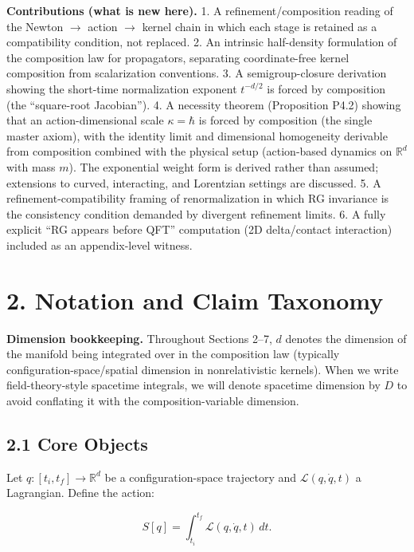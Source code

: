 \documentclass[
]{article}
\begin{document}
\textbf{Contributions (what is new here).} 1. A refinement/composition
reading of the Newton \(\to\) action \(\to\) kernel chain in which each
stage is retained as a compatibility condition, not replaced. 2. An
intrinsic half-density formulation of the composition law for
propagators, separating coordinate-free kernel composition from
scalarization conventions. 3. A semigroup-closure derivation showing the
short-time normalization exponent \(t^{-d/2}\) is forced by composition
(the ``square-root Jacobian''). 4. A necessity theorem (Proposition
P4.2) showing that an action-dimensional scale \(\kappa=\hbar\) is
forced by composition (the single master axiom), with the identity limit
and dimensional homogeneity derivable from composition combined with the
physical setup (action-based dynamics on \(\mathbb{R}^d\) with mass
\(m\)). The exponential weight form is derived rather than assumed;
extensions to curved, interacting, and Lorentzian settings are
discussed. 5. A refinement-compatibility framing of renormalization in
which RG invariance is the consistency condition demanded by divergent
refinement limits. 6. A fully explicit ``RG appears before QFT''
computation (2D delta/contact interaction) included as an appendix-level
witness.

\hypertarget{notation-and-claim-taxonomy}{%
\section{2. Notation and Claim
Taxonomy}\label{notation-and-claim-taxonomy}}

\textbf{Dimension bookkeeping.} Throughout Sections 2--7, \(d\) denotes
the dimension of the manifold being integrated over in the composition
law (typically configuration-space/spatial dimension in nonrelativistic
kernels). When we write field-theory-style spacetime integrals, we will
denote spacetime dimension by \(D\) to avoid conflating it with the
composition-variable dimension.

\hypertarget{core-objects}{%
\subsection{2.1 Core Objects}\label{core-objects}}

Let \(q:[t_i,t_f]\to \mathbb{R}^d\) be a configuration-space trajectory
and \(\mathcal{L}(q,\dot q,t)\) a Lagrangian. Define the action:

\[
S[q] = \int_{t_i}^{t_f} \mathcal{L}(q,\dot q,t)\,dt.
\]
\end{document}
